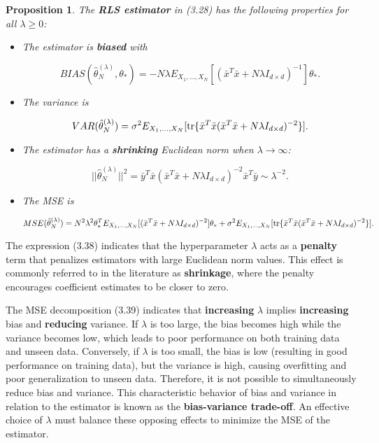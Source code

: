 \documentclass{report}
\newtheorem{proposition}{Proposition}[chapter]
\begin{document}
\begin{proposition}
The \textbf{RLS estimator} in (3.28) has the following properties for all $\lambda \geq 0$:
\begin{itemize}
\item The estimator is \textbf{biased} with

\begin{equation}
BIAS(\hat{\theta}_N^{(\lambda)}, \theta_*) = -N\lambda E_{X_1,\dots,X_N}[(\bar{x}^T\bar{x}+N\lambda I_{d\times d})^{-1}]\theta_*.
\end{equation}

\item The variance is

\begin{equation}
VAR(\hat{\theta}_N^{(\lambda)}) = \sigma^2E_{X_1,\dots,X_N}[\textup{tr}\{\bar{x}^T\bar{x}(\bar{x}^T\bar{x}+N\lambda I_{d\times d})^{-2}\}].
\end{equation}

\item The estimator has a \textbf{shrinking} Euclidean norm when $\lambda \to \infty$:

\begin{equation}
||\hat{\theta}_N^{(\lambda)}||^2 = \bar{y}^T\bar{x}(\bar{x}^T\bar{x} +N\lambda I_{d\times d})^{-2}\bar{x}^T\bar{y} \sim \lambda^{-2}.
\end{equation}

\item The MSE is

\begin{equation}
MSE(\hat{\theta}_N^{(\lambda)}) = N^2\lambda^2\theta_*^TE_{X_1,\dots,X_N}[(\bar{x}^T\bar{x}+N\lambda I_{d\times d})^{-2}]\theta_* +  \sigma^2E_{X_1,\dots,X_N}[\textup{tr}\{\bar{x}^T\bar{x}(\bar{x}^T\bar{x}+N\lambda I_{d\times d})^{-2}\}].
\end{equation}
\end{itemize}
\end{proposition}

The expression (3.38) indicates that the hyperparameter $\lambda$ acts as a \textbf{penalty} term that penalizes estimators with large Euclidean norm values. This effect is commonly referred to in the literature as \textbf{shrinkage}, where the penalty encourages coefficient estimates to be closer to zero.

The MSE decomposition (3.39) indicates that \textbf{increasing} $\lambda$ implies \textbf{increasing} bias and \textbf{reducing} variance. If $\lambda$ is too large, the bias becomes high while the variance becomes low, which leads to poor performance on both training data and unseen data. Conversely, if $\lambda$ is too small, the bias is low (resulting in good performance on training data), but the variance is high, causing overfitting and poor generalization to unseen data. Therefore, it is not possible to simultaneously reduce bias and variance. This characteristic behavior of bias and variance in relation to the estimator is known as the \textbf{bias-variance trade-off}. An effective choice of $\lambda$ must balance these opposing effects to minimize the MSE of the estimator.
\end{document}
